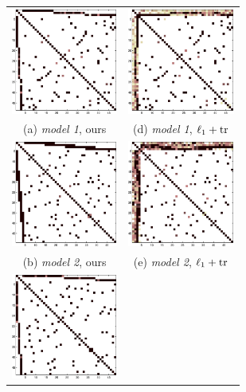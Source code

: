 \begin{figure}
\label{fig:synth}
\center
\begin{tabular}{cc}
    \includegraphics[width=3.5cm]{fig/disjoint_om} 
  & \includegraphics[width=3.5cm]{fig/disjoint_tr} 
   \\    (a) \textit{model 1}, ours & (d)  \textit{model 1}, $\ell_1+{\rm tr}$ \\[6pt]
      \includegraphics[width=3.5cm]{fig/overlap_om}
  &   \includegraphics[width=3.5cm]{fig/overlap_tr}
   \\    (b)  \textit{model 2}, ours   & (e)  \textit{model 2}, $\ell_1+{\rm tr}$    \\[6pt]
      \includegraphics[width=3.5cm]{fig/diff_om}

\end{tabular}
\end{figure}
